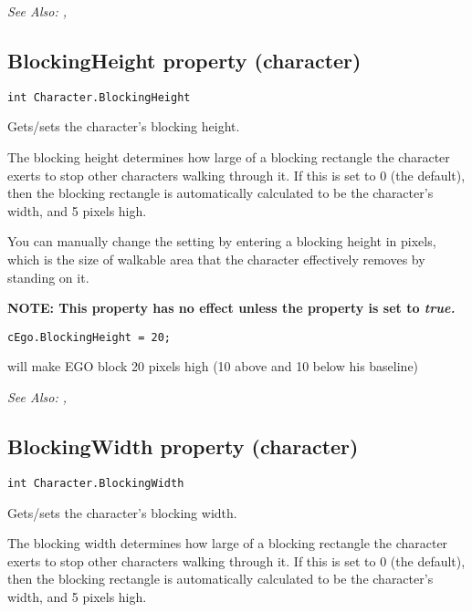 \it{See Also:} ,


\subsection{BlockingHeight property (character)}\label{Character.BlockingHeight}%

\begin{verbatim}
int Character.BlockingHeight
\end{verbatim}
Gets/sets the character's blocking height.

The blocking height determines how large of a blocking rectangle the character exerts to
stop other characters walking through it. If this is set to 0 (the default), then the
blocking rectangle is automatically calculated to be the character's width, and 5 pixels
high.

You can manually change the setting by entering a blocking height in pixels, which is the
size of walkable area that the character effectively removes by standing on it.

\bf{NOTE:} This property has no effect unless the  property
is set to \it{true}.

\begin{verbatim}
cEgo.BlockingHeight = 20;
\end{verbatim}
will make EGO block 20 pixels high (10 above and 10 below his baseline)

\it{See Also:} ,


\subsection{BlockingWidth property (character)}\label{Character.BlockingWidth}%

\begin{verbatim}
int Character.BlockingWidth
\end{verbatim}
Gets/sets the character's blocking width.

The blocking width determines how large of a blocking rectangle the character exerts to
stop other characters walking through it. If this is set to 0 (the default), then the
blocking rectangle is automatically calculated to be the character's width, and 5 pixels
high.

